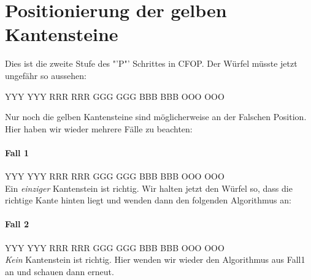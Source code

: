 \section{Positionierung der gelben Kantensteine}
Dies ist die zweite Stufe des "'P"' Schrittes in CFOP.
Der Würfel müsste jetzt ungefähr so aussehen:
\begin{center}
  \RubikCubeGreyAll%
	      {Y}{Y}{Y}
	      {Y}{Y}{Y}%
		 {R}{R}{R}
		 {R}{R}{R}%
		 {G}{G}{G}
		 {G}{G}{G}%
		{B}{B}{B}
		{B}{B}{B}%
		{O}{O}{O}
		{O}{O}{O}%
\end{center}

Nur noch die gelben Kantensteine sind möglicherweise an der Falschen Position. Hier
haben wir wieder mehrere Fälle zu beachten:

\paragraph{Fall 1}
\RubikCubeGreyAll%
            {Y}{Y}{Y}
            {Y}{Y}{Y}%
               {R}{R}{R}
	       {R}{R}{R}%
	       {G}{G}{G}
	       {G}{G}{G}%
	      {B}{B}{B}
	      {B}{B}{B}%
	      {O}{O}{O}
	      {O}{O}{O}%
\\[1em]
Ein \emph{einziger} Kantenstein ist richtig. Wir halten jetzt den Würfel so, dass
die richtige Kante hinten liegt und wenden dann den folgenden Algorithmus an:
\begin{center}
\end{center}

\paragraph{Fall 2}
\RubikCubeGreyAll%
            {Y}{Y}{Y}
            {Y}{Y}{Y}%
               {R}{R}{R}
	       {R}{R}{R}%
	       {G}{G}{G}
	       {G}{G}{G}%
	      {B}{B}{B}
	      {B}{B}{B}%
	      {O}{O}{O}
	      {O}{O}{O}%
\\[1em]
\emph{Kein} Kantenstein ist richtig. Hier wenden wir wieder den Algorithmus aus
Fall1 an und schauen dann erneut.
\begin{center}
\end{center}


